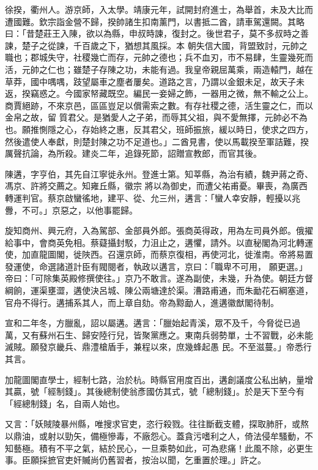 \begin{pinyinscope}
 徐揆，衢州人。游京師，入太學。靖康元年，試開封府進士，為舉首，未及大比而遭國難。欽宗詣金營不歸，揆帥諸生扣南薰門，以書抵二酋，請車駕還闕。其略曰：「昔楚莊王入陳，欲以為縣，申叔時諫，復封之。後世君子，莫不多叔時之善諫，楚子之從諫，千百歲之下，猶想其風採。本
 朝失信大國，背盟致討，元帥之職也；郡城失守，社稷幾亡而存，元帥之德也；兵不血刃，市不易肆，生靈幾死而活，元帥之仁也；雖楚子存陳之功，未能有過。我皇帝親屈萬乘，兩造轅門，越在草莽，國中喁喁，跂望屬車之塵者屢矣。道路之言，乃謂以金銀未足，故天子未返，揆竊惑之。今國家帑藏既空。編民一妾婦之飾，一器用之微，無不輸之公上。商賈絕跡，不來京邑，區區豈足以償需索之數。有存社稷之德，活生靈之仁，而以金帛之故，留
 質君父。是猶愛人之子弟，而辱其父祖，與不愛無擇，元帥必不為也。願推惻隱之心，存始終之惠，反其君父，班師振旅，緩以時日，使求之四方，然後遣使人奉獻，則楚封陳之功不足道也。」二酋見書，使以馬載揆至軍詰難，揆厲聲抗論，為所殺。建炎二年，追錄死節，詔贈宣教郎，而官其後。



 陳遘，字亨伯，其先自江寧徙永州。登進士第。知莘縣，為治有績，魏尹蔣之奇、馮京、許將交薦之。知雍丘縣，徽宗
 將以為御史，而遭父祐甫憂。畢喪，為廣西轉運判官。蔡京啟蠻徭地，建平、從、允三州，遘言：「蠻人幸安靜，輕擾以兆釁，不可。」京惡之，以他事罷歸。



 旋知商州、興元府，入為駕部、金部員外郎。張商英得政，用為左司員外郎。俄擢給事中，會商英免相。蔡薿攝封駁，力沮止之，遘懼，請外。以直秘閣為河北轉運使，加直龍圖閣，徙陜西。召還京師，而蔡京復相，再使河北，徙淮南。帝將易置發運使，命選諸道計臣有閥閱者，執政以遘言，京曰：「職卑不可用，
 願更選。」帝曰：「可除集英殿修撰使往。」京乃不敢言。遂為副使，未幾，升為使。朝廷方督綱餉，運渠壅澀，遘使決呂城、陳公兩塘達於渠。漕路甫通，而朱勔花石綱塞道，官舟不得行。遘捕系其人，而上章自劾。帝為黥勔人，進遘徽猷閣待制。



 宣和二年冬，方臘亂，詔以屬遘。遘言：「臘始起青溪，眾不及千，今脅從已過萬，又有蘇州石生、歸安陸行兒，皆聚黨應之。東南兵弱勢單，士不習戰，必未能滅賊。願發京畿兵、鼎澧槍盾手，兼程以來，庶幾蜂起愚
 民。不至滋蔓。」帝悉行其言。



 加龍圖閣直學士，經制七路，治於杭。時縣官用度百出，遘創議度公私出納，量增其贏，號「經制錢」。其後總制使翁彥國仿其式，號「總制錢」。於是天下至今有「經總制錢」名，自兩人始也。



 又言：「妖賊陵暴州縣，唯搜求官吏，恣行殺戮。往往斷截支體，探取肺肝，或熬以鼎油，或射以勁矢，備極慘毒，不廠怨心。蓋貪污嗜利之人，倚法侵牟騷動，不知藝極。積有不平之氣，結於民心，一旦乘勢如此，可為悲痛！此風不除，必更生
 事。臣願採摭官吏奸贓尚仍舊習者，按治以聞，乞重置於理。」許之。




\end{pinyinscope}
